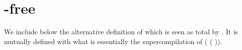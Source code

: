 \section*{\assertTotal{}-free }\label{sec:safefold}

We include below the alternative definition of  which
is seen as total by \idris{}. It is mutually defined with what is essentially
the supercompilation of
(\IdrisKeyword{\textbackslash}  \IdrisKeyword{=>}   ( )).

